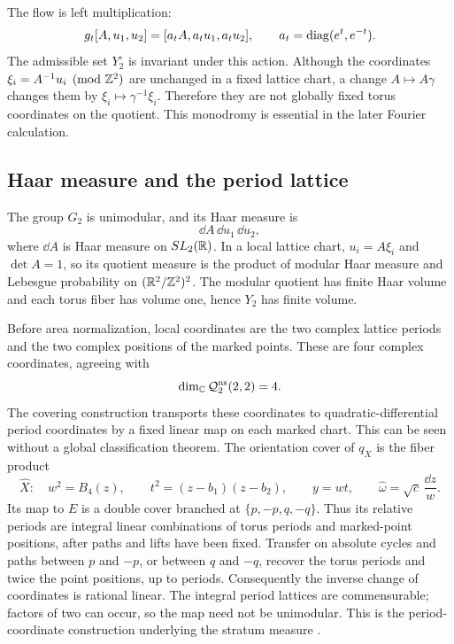 The flow is left multiplication:
\begin{equation}
 g_t[A,u_1,u_2]
   =[a_tA,a_tu_1,a_tu_2],
 \qquad a_t=\operatorname{diag}(e^t,e^{-t}).
 \label{eq:genus2homflow}
\end{equation}
The admissible set $Y_2^\circ$ is invariant under this action.
Although the coordinates $\xi_i=A^{-1}u_i\pmod{\mathbb Z^2}$ are
unchanged in a fixed lattice chart, a change $A\mapsto A\gamma$
changes them by $\xi_i\mapsto\gamma^{-1}\xi_i$.  Therefore they
are not globally fixed torus coordinates on the quotient.
This monodromy is essential in the later Fourier calculation.

\subsection{Haar measure and the period lattice}
\label{subsec:genus2haarmeasure}

The group $G_2$ is unimodular, and its Haar measure is
\[
 \dd A\,\dd u_1\,\dd u_2,
\]
where $\dd A$ is Haar measure on $SL_2(\mathbb R)$.
In a local lattice chart, $u_i=A\xi_i$ and $\det A=1$, so its
quotient measure is the product of modular Haar measure and
Lebesgue probability on $(\mathbb R^2/\mathbb Z^2)^2$.
The modular quotient has finite Haar volume and each torus fiber
has volume one, hence $Y_2$ has finite volume.

Before area normalization, local coordinates are the two complex
lattice periods and the two complex positions of the marked
points.  These are four complex coordinates, agreeing with
\[
 \dim_{\mathbb C}\mathcal Q^{\mathrm{ns}}_2(2,2)=4.
\]
The covering construction transports these coordinates to
quadratic-differential period coordinates by a fixed linear map
on each marked chart.  This can be seen without a global
classification theorem.  The orientation cover of $q_X$ is the
fiber product
\[
 \widehat X:\quad
 w^2=B_4(z),\qquad t^2=(z-b_1)(z-b_2),
 \qquad y=wt,
 \qquad \widehat\omega=\sqrt c\,\frac{\dd z}{w}.
\]
Its map to $E$ is a double cover branched at
$\{p,-p,q,-q\}$.  Thus its relative periods are integral linear
combinations of torus periods and marked-point positions, after
paths and lifts have been fixed.  Transfer on absolute cycles and
paths between $p$ and $-p$, or between $q$ and $-q$, recover the
torus periods and twice the point positions, up to periods.
Consequently the inverse change of coordinates is rational
linear.  The integral period lattices are commensurable; factors
of two can occur, so the map need not be unimodular.  This is the
period-coordinate construction underlying the stratum measure
\cite[Sections~1.1.1--1.1.2]{LanneauComponents}.

